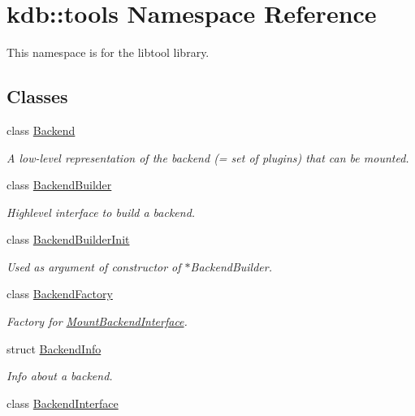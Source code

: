\hypertarget{namespacekdb_1_1tools}{}\section{kdb\+::tools Namespace Reference}
\label{namespacekdb_1_1tools}


This namespace is for the libtool library.  


\subsection*{Classes}
\begin{DoxyCompactItemize}
\item 
class \mbox{\hyperlink{classkdb_1_1tools_1_1Backend}{Backend}}
\begin{DoxyCompactList}\small\item\em A low-\/level representation of the backend (= set of plugins) that can be mounted. \end{DoxyCompactList}\item 
class \mbox{\hyperlink{classkdb_1_1tools_1_1BackendBuilder}{Backend\+Builder}}
\begin{DoxyCompactList}\small\item\em Highlevel interface to build a backend. \end{DoxyCompactList}\item 
class \mbox{\hyperlink{classkdb_1_1tools_1_1BackendBuilderInit}{Backend\+Builder\+Init}}
\begin{DoxyCompactList}\small\item\em Used as argument of constructor of $\ast$\+Backend\+Builder. \end{DoxyCompactList}\item 
class \mbox{\hyperlink{classkdb_1_1tools_1_1BackendFactory}{Backend\+Factory}}
\begin{DoxyCompactList}\small\item\em Factory for \mbox{\hyperlink{classkdb_1_1tools_1_1MountBackendInterface}{Mount\+Backend\+Interface}}. \end{DoxyCompactList}\item 
struct \mbox{\hyperlink{structkdb_1_1tools_1_1BackendInfo}{Backend\+Info}}
\begin{DoxyCompactList}\small\item\em Info about a backend. \end{DoxyCompactList}\item 
class \mbox{\hyperlink{classkdb_1_1tools_1_1BackendInterface}{Backend\+Interface}}

\end{DoxyCompactItemize}
